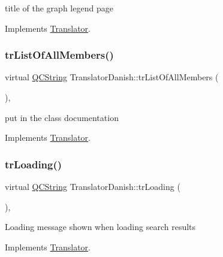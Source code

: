 title of the graph legend page 

Implements \mbox{\hyperlink{class_translator}{Translator}}.

\mbox{\label{class_translator_danish_ab7f13b8ed5b486a083ed50bddf5c2a5b}} 
\subsubsection{\texorpdfstring{trListOfAllMembers()}{trListOfAllMembers()}}
{\footnotesize\ttfamily virtual \mbox{\hyperlink{class_q_c_string}{Q\+C\+String}} Translator\+Danish\+::tr\+List\+Of\+All\+Members (\begin{DoxyParamCaption}{ }\end{DoxyParamCaption})\hspace{0.3cm}{\ttfamily [inline]}, {\ttfamily [virtual]}}

put in the class documentation 

Implements \mbox{\hyperlink{class_translator}{Translator}}.

\mbox{\label{class_translator_danish_a4146afb518e742269190704e3c8fc6ae}} 
\subsubsection{\texorpdfstring{trLoading()}{trLoading()}}
{\footnotesize\ttfamily virtual \mbox{\hyperlink{class_q_c_string}{Q\+C\+String}} Translator\+Danish\+::tr\+Loading (\begin{DoxyParamCaption}{ }\end{DoxyParamCaption})\hspace{0.3cm}{\ttfamily [inline]}, {\ttfamily [virtual]}}

Loading message shown when loading search results 

Implements \mbox{\hyperlink{class_translator}{Translator}}.

\mbox{\label{class_translator_danish_ad7767cd4646f24f42f1239d0fcebc633}} 
